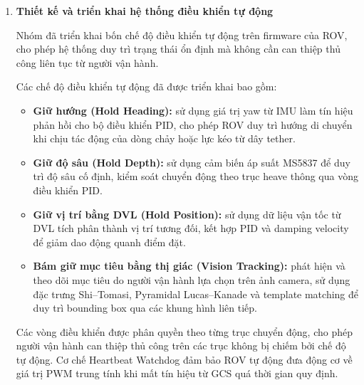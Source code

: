 \documentclass[../DoAn.tex]{subfiles}
\begin{document}
\begin{enumerate}
\begin{itemize}
    \item Phát hiện bất thường cảm biến tự động bằng Z-Score ($|z| > 2{,}5$) và tạo tóm tắt nhiệm vụ bằng mô hình Gemini 2.5 Flash.

    \item Hệ thống thông báo realtime qua SSE (Server-Sent Events), nhật ký kiểm toán (Audit Log) và dashboard thống kê tổng quan.
\end{itemize}

Nền tảng Web đã hoạt động đầy đủ với ba vai trò người dùng, hỗ trợ luồng từ upload dữ liệu sau nhiệm vụ đến phân tích hậu kỳ và trích xuất bằng chứng.

\item \textbf{Thiết kế và triển khai hệ thống điều khiển tự động}

Nhóm đã triển khai bốn chế độ điều khiển tự động trên firmware của ROV, cho phép hệ thống duy trì trạng thái ổn định mà không cần can thiệp thủ công liên tục từ người vận hành.

Các chế độ điều khiển tự động đã được triển khai bao gồm:

\begin{itemize}
    \item \textbf{Giữ hướng (Hold Heading):} sử dụng giá trị yaw từ IMU làm tín hiệu phản hồi cho bộ điều khiển PID, cho phép ROV duy trì hướng di chuyển khi chịu tác động của dòng chảy hoặc lực kéo từ dây tether.

    \item \textbf{Giữ độ sâu (Hold Depth):} sử dụng cảm biến áp suất MS5837 để duy trì độ sâu cố định, kiểm soát chuyển động theo trục heave thông qua vòng điều khiển PID.

    \item \textbf{Giữ vị trí bằng DVL (Hold Position):} sử dụng dữ liệu vận tốc từ DVL tích phân thành vị trí tương đối, kết hợp PID và damping velocity để giảm dao động quanh điểm đặt.

    \item \textbf{Bám giữ mục tiêu bằng thị giác (Vision Tracking):} phát hiện và theo dõi mục tiêu do người vận hành lựa chọn trên ảnh camera, sử dụng đặc trưng Shi--Tomasi, Pyramidal Lucas--Kanade và template matching để duy trì bounding box qua các khung hình liên tiếp.
\end{itemize}

Các vòng điều khiển được phân quyền theo từng trục chuyển động, cho phép người vận hành can thiệp thủ công trên các trục không bị chiếm bởi chế độ tự động. Cơ chế Heartbeat Watchdog đảm bảo ROV tự động đưa động cơ về giá trị PWM trung tính khi mất tín hiệu từ GCS quá thời gian quy định.


\end{enumerate}
\end{document}

